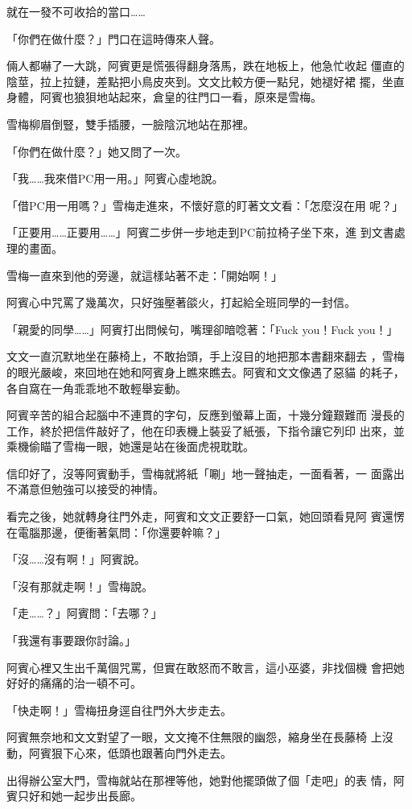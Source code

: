 就在一發不可收拾的當口……

「你們在做什麼？」門口在這時傳來人聲。

倆人都嚇了一大跳，阿賓更是慌張得翻身落馬，跌在地板上，他急忙收起
僵直的陰莖，拉上拉鏈，差點把小鳥皮夾到。文文比較方便一點兒，她褪好裙
擺，坐直身體，阿賓也狼狽地站起來，倉皇的往門口一看，原來是雪梅。

雪梅柳眉倒豎，雙手插腰，一臉陰沉地站在那裡。

「你們在做什麼？」她又問了一次。

「我……我來借PC用一用。」阿賓心虛地說。

「借PC用一用嗎？」雪梅走進來，不懷好意的盯著文文看：「怎麼沒在用
呢？」

「正要用……正要用……」阿賓二步併一步地走到PC前拉椅子坐下來，進
到文書處理的畫面。

雪梅一直來到他的旁邊，就這樣站著不走：「開始啊！」

阿賓心中咒罵了幾萬次，只好強壓著燄火，打起給全班同學的一封信。

「親愛的同學……」阿賓打出問候句，嘴理卻暗唸著：「Fuck you！Fuck
you！」

文文一直沉默地坐在藤椅上，不敢抬頭，手上沒目的地把那本書翻來翻去
，雪梅的眼光嚴峻，來回地在她和阿賓身上瞧來瞧去。阿賓和文文像遇了惡貓
的耗子，各自窩在一角乖乖地不敢輕舉妄動。

阿賓辛苦的組合起腦中不連貫的字句，反應到螢幕上面，十幾分鐘艱難而
漫長的工作，終於把信件敲好了，他在印表機上裝妥了紙張，下指令讓它列印
出來，並乘機偷瞄了雪梅一眼，她還是站在後面虎視耽耽。

信印好了，沒等阿賓動手，雪梅就將紙「唰」地一聲抽走，一面看著，一
面露出不滿意但勉強可以接受的神情。

看完之後，她就轉身往門外走，阿賓和文文正要舒一口氣，她回頭看見阿
賓還愣在電腦那邊，便衝著氣問：「你還要幹嘛？」

「沒……沒有啊！」阿賓說。

「沒有那就走啊！」雪梅說。

「走……？」阿賓問：「去哪？」

「我還有事要跟你討論。」

阿賓心裡又生出千萬個咒罵，但實在敢怒而不敢言，這小巫婆，非找個機
會把她好好的痛痛的治一頓不可。

「快走啊！」雪梅扭身逕自往門外大步走去。

阿賓無奈地和文文對望了一眼，文文掩不住無限的幽怨，縮身坐在長藤椅
上沒動，阿賓狠下心來，低頭也跟著向門外走去。

出得辦公室大門，雪梅就站在那裡等他，她對他擺頭做了個「走吧」的表
情，阿賓只好和她一起步出長廊。

